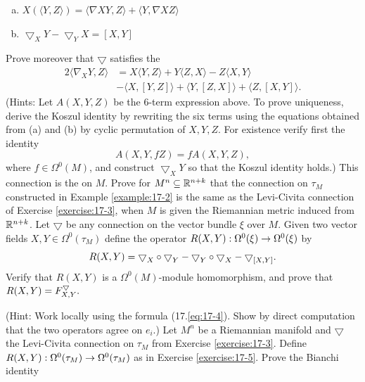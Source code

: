 \begin{enumerate}[label=\theexercise.\arabic*.,ref=\theexercise.\arabic*,leftmargin=2.7em]
    \begin{enumerate}[(a)]
      \item $X( {\langle Y,Z\rangle }) = \langle \nabla {XY},Z\rangle  + \langle Y,\nabla {XZ}\rangle$
      \item ${ \bigtriangledown  }_{X}Y- { \bigtriangledown  }_{Y}X = [  {X,Y}]$
    \end{enumerate}
    Prove moreover that $\bigtriangledown$ satisfies the 
    \[
      \begin{aligned}
        2\langle {\nabla }_{X}Y,Z\rangle  
        & = X\langle Y,Z\rangle  + Y\langle Z,X\rangle - Z\langle X,Y\rangle \\
        & - \langle X,[  {Y,Z}]  \rangle  + \langle Y,[  {Z,X}]  \rangle  + \langle Z,[  {X,Y}]  \rangle.
      \end{aligned}
    \]
    (Hints: Let $A( {X,Y,Z})$ be the 6-term expression above. To prove uniqueness, derive the Koszul identity by rewriting the six terms using the equations obtained from (a) and (b) by cyclic permutation of $X,Y,Z$. For existence verify first the identity
    \[
      A( {X,Y,{fZ}})  = {fA}( {X,Y,Z}),
    \]
    where $f \in  {\Omega }^{0}( M)$, and construct ${ \bigtriangledown  }_{X}Y$ so that the Koszul identity holds.) This connection is the  on $M$.
  \NewItem Prove for ${M}^{n} \subseteq  {\ensuremath{\mathbb{R}}}^{n + k}$ that the connection on ${\tau }_{M}$ constructed in Example \ref{example:17-2} is the same as the Levi-Civita connection of Exercise \ref{exercise:17-3}, when $M$ is given the Riemannian metric induced from ${\mathbb{R}}^{n + k}$.
  \NewItem Let $\bigtriangledown$ be any connection on the vector bundle $\xi$ over $M$. Given two vector fields $X,Y \in  {\Omega }^{0}( {\tau }_{M})$ define the operator $R( {X,Y})  : {\Omega }^{0}( \xi )  \rightarrow  {\Omega }^{0}( \xi )$ by
    \[
      R( {X,Y})  = {\bigtriangledown }_{X} \circ  {\bigtriangledown}_{Y}- {\bigtriangledown }_{Y} \circ  {\bigtriangledown}_{X}- {\bigtriangledown }_{[  X,Y]  }.
    \]
    Verify that $R( {X,Y})$ is a ${\Omega }^{0}( M)$-module homomorphism, and prove that $R( {X,Y})  = {F}_{X,Y}^{\bigtriangledown }.$
    \par(Hint: Work locally using the formula (17.\ref{eq:17-4}). Show by direct computation that the two operators agree on ${e}_{i}$.)
  \NewItem Let ${M}^{n}$ be a Riemannian manifold and $\bigtriangledown$ the Levi-Civita connection on ${\tau }_{M}$ from Exercise \ref{exercise:17-3}. Define $R( {X,Y})  : {\Omega }^{0}( {\tau }_{M})  \rightarrow  {\Omega }^{0}( {\tau }_{M})$ as in Exercise \ref{exercise:17-5}. Prove the Bianchi identity

\end{enumerate}
